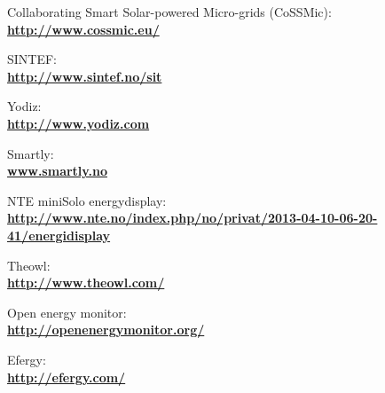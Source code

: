 \begin{thebibliography}{1}

 Collaborating Smart Solar-powered Micro-grids (CoSSMic):\\ \textbf{\url{http://www.cossmic.eu/}}

 SINTEF: \\
\textbf{ \url{ http://www.sintef.no/sit}}

 Yodiz: \\
\textbf{ \url{ http://www.yodiz.com}}
        
 Smartly: \\
\textbf{ \url{www.smartly.no}}

 NTE miniSolo energydisplay:\\
\textbf{ \url{http://www.nte.no/index.php/no/privat/2013-04-10-06-20-41/energidisplay}}

 Theowl:\\
\textbf{ \url{http://www.theowl.com/}}

 Open energy monitor:\\
\textbf{ \url{http://openenergymonitor.org/}}

 Efergy:\\
\textbf{ \url{http://efergy.com/}}


\end{thebibliography}
